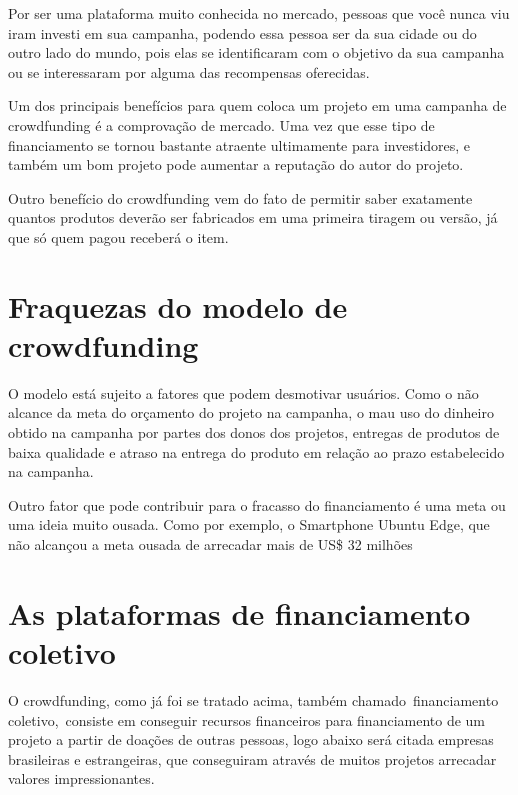 \documentclass{classe_cn}                 %
\begin{document}
Por ser uma plataforma muito conhecida no mercado, pessoas que você nunca viu iram investi em sua campanha, podendo essa pessoa ser da sua cidade ou do outro lado do mundo, pois elas se identificaram com o objetivo da sua campanha ou se interessaram por alguma das recompensas oferecidas.

Um dos principais benefícios para quem coloca um projeto em uma campanha de crowdfunding é a comprovação de mercado. Uma vez que esse tipo de financiamento se tornou bastante atraente ultimamente para investidores, e também um bom projeto pode aumentar a reputação do autor do projeto.

Outro benefício do crowdfunding vem do fato de permitir saber exatamente quantos produtos deverão ser fabricados em uma primeira tiragem ou versão, já que só quem pagou receberá o item. \cite{PEREIRA:2016}

\section{Fraquezas do modelo de crowdfunding}

O modelo está sujeito a fatores que podem desmotivar usuários. Como o não alcance da meta do orçamento do projeto na campanha, o mau uso do dinheiro obtido na campanha por partes dos donos dos projetos, entregas de produtos de baixa qualidade e atraso na entrega do produto em relação ao prazo estabelecido na campanha. \cite{PEREIRA:2016}

Outro fator que pode contribuir para o fracasso do financiamento é uma meta ou uma ideia muito ousada. Como por exemplo, o Smartphone Ubuntu Edge, que não alcançou a meta ousada de arrecadar mais de US\$ 32 milhões \cite{GAZETA:2017}

\section{As plataformas de financiamento coletivo}

O crowdfunding, como já foi se tratado acima, também chamado financiamento coletivo, consiste em conseguir recursos financeiros para financiamento de um projeto a partir de doações de outras pessoas, logo abaixo será citada empresas brasileiras e estrangeiras, que conseguiram através de muitos projetos arrecadar valores impressionantes.
\end{document}
